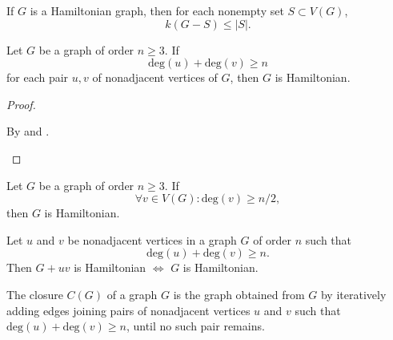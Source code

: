 
\begin{frame}{}
  \begin{theorem}
    If $G$ is a Hamiltonian graph, then for each nonempty set $S \subset V(G)$,
    \[
      k(G - S) \le \big\lvert S \big\rvert.
    \]
  \end{theorem}
\end{frame}

\begin{frame}{}
  \begin{theorem}
    Let $G$ be a graph of order $n \ge 3$. If
    \[
      \text{deg}(u) + \text{deg}(v) \ge n
    \]
    for each pair $u,v$ of nonadjacent vertices of $G$,
    then $G$ is Hamiltonian.
  \end{theorem}

  \pause
  \begin{proof}
    \begin{center}
      By  and .
    \end{center}
  \end{proof}
\end{frame}

\begin{frame}{}
  \begin{theorem}
    Let $G$ be a graph of order $n \ge 3$. If
    \[
      \forall v \in V(G): \text{deg}(v) \ge n/2,
    \]
    then $G$ is Hamiltonian.
  \end{theorem}
\end{frame}

\begin{frame}{}
  \begin{theorem}
    Let $u$ and $v$ be nonadjacent vertices in a graph $G$ of order $n$ such that
    \[
      \text{deg}(u) + \text{deg}(v) \ge n.
    \]
    Then $G + uv$ is Hamiltonian $\iff$ $G$ is Hamiltonian.
  \end{theorem}

  \pause
  \begin{definition}[Closure $C(G)$]
    The closure $C(G)$ of a graph $G$ is the graph obtained from $G$
    by iteratively adding edges joining pairs of nonadjacent vertices
    $u$ and $v$ such that $\text{deg}(u) + \text{deg}(v) \ge n$,
    until no such pair remains.
  \end{definition}
\end{frame}

